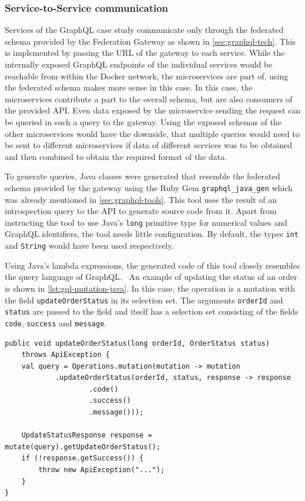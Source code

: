 \subsubsection{Service-to-Service communication}\label{sec:gql-s2s}

Services of the GraphQL case study communicate only through the federated schema provided by the Federation Gateway as shown in \autoref{sec:graphql-tech}.
This is implemented by passing the \ac{URL} of the gateway to each service.
While the internally exposed GraphQL endpoints of the individual services would be reachable from within the Docker network, the microservices are part of, using the federated schema makes more sense in this case.
In this case, the microservices contribute a part to the overall schema, but are also consumers of the provided \ac{API}.
Even data exposed by the microservice sending the request can be queried in such a query to the gateway.
Using the exposed schemas of the other microservices would have the downside, that multiple queries would need to be sent to different microservices if data of different services was to be obtained and then combined to obtain the required format of the data.

To generate queries, Java classes were generated that resemble the federated schema provided by the gateway using the Ruby Gem \texttt{graphql\_java\_gen} which was already mentioned in \autoref{sec:graphql-tools}.
This tool uses the result of an introspection query to the \ac{API} to generate source code from it.
Apart from instructing the tool to use Java's \texttt{long} primitive type for numerical values and GraphQL identifiers, the tool needs little configuration.
By default, the types \texttt{int} and \texttt{String} would have been used respectively.

Using Java's lambda expressions, the generated code of this tool closely resembles the query language of GraphQL.~%
An example of updating the status of an order is shown in \autoref{lst:gql-mutation-java}.
In this case, the operation is a mutation with the field \texttt{updateOrderStatus} in its selection set.
The arguments \texttt{orderId} and \texttt{status} are passed to the field and itself has a selection set consisting of the fields \texttt{code}, \texttt{success} and \texttt{message}.

\begin{minipage}{\linewidth}
\begin{lstlisting}[style=java-ext, caption={Formulating Queries against GraphQL \acsp{API} using GraphQLJavaGen}, label={lst:gql-mutation-java}]
public void updateOrderStatus(long orderId, OrderStatus status) 
    throws ApiException {
    val query = Operations.mutation(mutation -> mutation
            .updateOrderStatus(orderId, status, response -> response
                    .code()
                    .success()
                    .message()));

    UpdateStatusResponse response = mutate(query).getUpdateOrderStatus();
    if (!response.getSuccess()) {
        throw new ApiException("...");
    }
}
\end{lstlisting}
\end{minipage}

